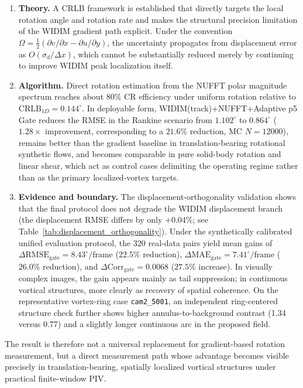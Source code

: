 \documentclass[lettersize,journal]{IEEEtran}
\newcommand{\CRLB}{\mathrm{CRLB}}
\begin{document}
\begin{enumerate}
  \item \textbf{Theory.}
    A CRLB framework is established that directly targets the local rotation angle and rotation rate and makes the structural precision limitation of the WIDIM gradient path explicit.
    Under the convention $\Omega=\tfrac{1}{2}(\partial v/\partial x-\partial u/\partial y)$,
    the uncertainty propagates from displacement error as $O(\sigma_d/\Delta x)$,
    which cannot be substantially reduced merely by continuing to improve WIDIM peak localization itself.

  \item \textbf{Algorithm.}
    Direct rotation estimation from the NUFFT polar magnitude spectrum reaches about $80\%$ CR efficiency under uniform rotation
    relative to $\CRLB_{1D}=0.144^\circ$.
    In deployable form,
    WIDIM(track)+NUFFT+Adaptive p5 Gate reduces the RMSE in the Rankine scenario
    from $1.102^\circ$ to $0.864^\circ$ ($1.28\times$ improvement, corresponding to a $21.6\%$ reduction, MC $N=12000$),
    remains better than the gradient baseline in translation-bearing rotational synthetic flows,
    and becomes comparable in pure solid-body rotation and linear shear, which act as control cases delimiting the operating regime rather than as the primary localized-vortex targets.

  \item \textbf{Evidence and boundary.}
    The displacement-orthogonality validation shows that the final protocol does not degrade the WIDIM displacement branch
    (the displacement RMSE differs by only $+0.04\%$; see Table~\ref{tab:displacement_orthogonality}).
    Under the synthetically calibrated unified evaluation protocol,
    the 320 real-data pairs yield mean gains of $\Delta\mathrm{RMSE}_{\mathrm{gate}}=8.43^\circ/\mathrm{frame}$ ($22.5\%$ reduction),
    $\Delta\mathrm{MAE}_{\mathrm{gate}}=7.41^\circ/\mathrm{frame}$ ($26.0\%$ reduction),
    and $\Delta\mathrm{Corr}_{\mathrm{gate}}=0.0068$ ($27.5\%$ increase).
    In visually complex images, the gain appears mainly as tail suppression;
    in continuous vortical structures, more clearly as recovery of spatial coherence.
    On the representative vortex-ring case \texttt{cam2\_5001}, an independent ring-centered structure check further shows higher annulus-to-background contrast (1.34 versus 0.77) and a slightly longer continuous arc in the proposed field.
\end{enumerate}

The result is therefore not a universal replacement for gradient-based rotation measurement, but a direct measurement path whose advantage becomes visible precisely in translation-bearing, spatially localized vortical structures under practical finite-window PIV.
\end{document}
